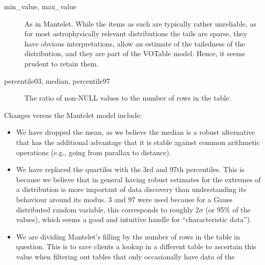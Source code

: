 \documentclass[11pt,a4paper]{ivoa}
\begin{document}
\begin{description}
\item[min\_value, max\_value] As in Mantelet.  While the items as such are
typically rather unreliable, as for most astrophysically relevant
distributions the tails are sparse, they have obvious interpretations,
allow an estimate of the tailedness of the distribution, and they are
part of the VOTable model.  Hence, it seems prudent to retain them.
\item[percentile03, median, percentile97} the 3rd, 50th, and 97th
percentiles of the distribution of the values in the column.
\item[fill\_factor] The ratio of non-NULL values to the number of rows
in the table.
\end{description}

Changes versus the Mantelet model include:

\begin{itemize}
\item We have dropped the mean, as we believe the median is a robust
alternative that has the additional advantage that it is stable against
common arithmetic operations (e.g., going from parallax to distance).
\item We have replaced the quartiles with the 3rd and 97th percentiles.
This is because we believe that in general having robust estimates for
the extremes of a distribution is more important of data discovery than
understanding its behaviour around its modus.  3 and 97 were used
because for a Gauss distributed random variable, this corresponds to
roughly $2\sigma$ (or 95\% of the values), which seems a good and
intuitive handle for ``characteristic data'').
\item We are dividing Mantelet's filling by the number of rows in the
table in question.  This is to save clients a lookup in a different
table to ascertain this value when filtering out tables that only
occasionally have data of the 

\end{itemize}


\end{document}
